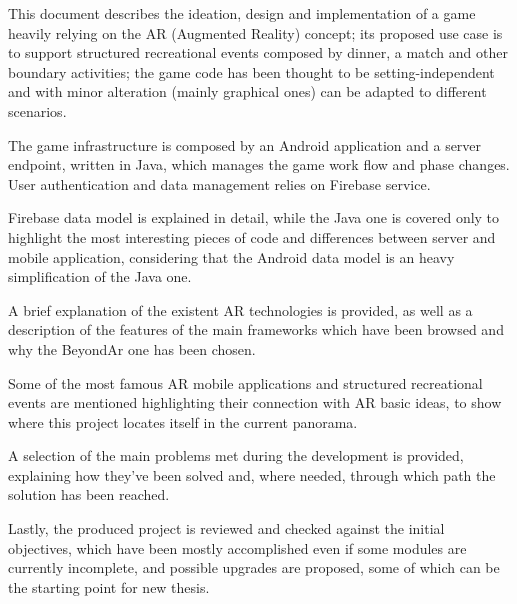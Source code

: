 \sommario
	
	This document describes the ideation, design and implementation of a game heavily relying on the AR (Augmented Reality) concept; its proposed use case is to support structured recreational events composed by dinner, a match and other boundary activities; the game code has been thought to be setting-independent and with minor alteration (mainly graphical ones) can be adapted to different scenarios.
	
	The game infrastructure is composed by an Android application and a server endpoint, written in Java, which manages the game work flow and phase changes.
	User authentication and data management relies on Firebase service.
	
	Firebase data model is explained in detail, while the Java one is covered only to highlight the most interesting pieces of code and differences between server and mobile application, considering that the Android data model is an heavy simplification of the Java one.
	
	A brief explanation of the existent AR technologies is provided, as well as a description of the features of the main frameworks which have been browsed and why the BeyondAr one has been chosen.
	
	Some of the most famous AR mobile applications and structured recreational events are mentioned highlighting their connection with AR basic ideas, to show where this project locates itself in the current panorama.
	
	A selection of the main problems met during the development is provided, explaining how they've been solved and, where needed, through which path the solution has been reached.
	
	Lastly, the produced project is reviewed and checked against the initial objectives, which have been mostly accomplished even if some modules are currently incomplete, and possible upgrades are proposed, some of which can be the starting point for new thesis.